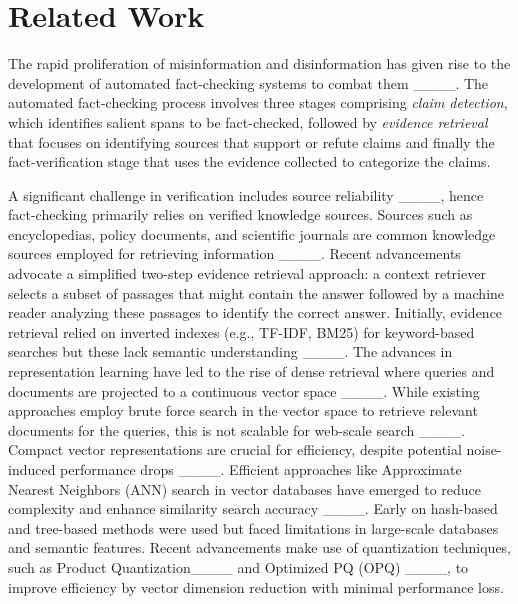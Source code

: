\section{Related Work}
\vspace{-1em}
The rapid proliferation of misinformation and disinformation has given rise to the development of automated fact-checking systems to combat them ____. The automated fact-checking process involves three stages comprising \textit{claim detection}, which identifies salient spans to be fact-checked, 
followed by \textit{evidence retrieval} that focuses on identifying sources that support or refute claims and finally the fact-verification stage that uses the evidence collected to categorize the claims.

A significant challenge in verification includes source reliability ____, hence fact-checking primarily relies on verified knowledge sources. Sources such as encyclopedias, policy documents, and scientific journals are common knowledge sources employed for retrieving information ____. Recent advancements advocate a simplified two-step evidence retrieval approach: a context retriever selects a subset of passages that might contain the answer followed by a machine reader analyzing these passages to identify the correct answer. Initially, evidence retrieval relied on inverted indexes (e.g., TF-IDF, BM25) for keyword-based searches but these lack semantic understanding ____. The advances in representation learning have led to the rise of dense retrieval where queries and documents are projected to a continuous vector space  ____. While existing approaches employ brute force search in the vector space to retrieve relevant documents for the queries, this is not scalable for web-scale search ____. Compact vector representations are crucial for efficiency, despite potential noise-induced performance drops ____. Efficient approaches like Approximate Nearest Neighbors (ANN) search in vector databases have emerged to reduce complexity and enhance similarity search accuracy ____. Early on hash-based and tree-based methods were used but faced limitations in large-scale databases and semantic features. Recent advancements make use of quantization techniques, such as Product Quantization____ and Optimized PQ (OPQ) ____, to improve efficiency by vector dimension reduction with minimal performance loss.

